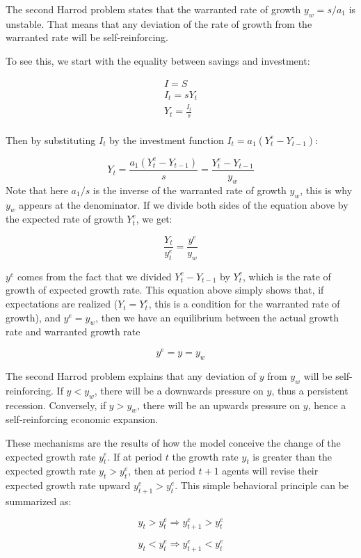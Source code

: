 \documentclass[
  letterpaper,
  DIV=11,
  numbers=noendperiod]{scrreprt}
\begin{document}
The second Harrod problem states that the warranted rate of growth
\(y_w = s/a_1\) is unstable. That means that any deviation of the rate
of growth from the warranted rate will be self-reinforcing.

To see this, we start with the equality between savings and investment:

\[
\begin{aligned}
I = S
\\
I_t = sY_t
\\
Y_t = \frac{I_t}{s}
\\
\end{aligned}
\]

Then by substituting \(I_t\) by the investment function
\(I_t = a_1(Y^e_t - Y_{t-1})\):

\[
Y_t = \frac{a_1(Y^e_t - Y_{t-1})}{s} = \frac{Y^e_t - Y_{t-1}}{y_w}
\] Note that here \(a_1/s\) is the inverse of the warranted rate of
growth \(y_w\), this is why \(y_w\) appears at the denominator. If we
divide both sides of the equation above by the expected rate of growth
\(Y^e_t\), we get:

\[\frac{Y_t}{y^e_t} = \frac{y^e}{y_w}\]

\(y^e\) comes from the fact that we divided \(Y^e_t - Y_{t-1}\) by
\(Y^e_t\), which is the rate of growth of expected growth rate. This
equation above simply shows that, if expectations are realized
(\(Y_t = Y^e_t\), this is a condition for the warranted rate of growth),
and \(y^e = y_w\), then we have an equilibrium between the actual growth
rate and warranted growth rate

\[y^e = y = y_w\]

The second Harrod problem explains that any deviation of \(y\) from
\(y_w\) will be self-reinforcing. If \(y<y_w\), there will be a
downwards pressure on \(y\), thus a persistent recession. Conversely, if
\(y>y_w\), there will be an upwards pressure on \(y\), hence a
self-reinforcing economic expansion.

These mechanisms are the results of how the model conceive the change of
the expected growth rate \(y^e_t\). If at period \(t\) the growth rate
\(y_t\) is greater than the expected growth rate \(y_t>y^e_t\), then at
period \(t+1\) agents will revise their expected growth rate upward
\(y^e_{t+1} > y^e_t\). This simple behavioral principle can be
summarized as:

\[y_t > y^e_t \Rightarrow y^e_{t+1} >y^e_t\]

\[y_t < y^e_t \Rightarrow y^e_{t+1} <y^e_t\]
\end{document}
